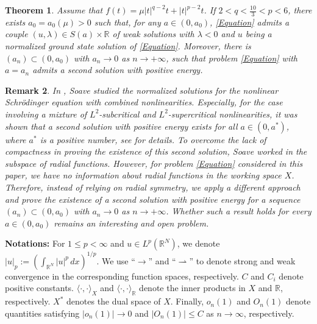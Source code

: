 \documentclass[11pt]{amsart}
\newtheorem{theorem}{Theorem}[section]
\newtheorem{remark}[theorem]{Remark}
\numberwithin{equation}{section}
\newcommand\R{\mathbb R}
\begin{document}
{{{\begin{theorem}\label{Th3}
     Assume that $ f(t)=\mu|t|^{q-2}t +|t|^{p-2}t$. If $2<q<\frac{10}{3}<p <6$, {there exists $a_0=a_0(\mu)>0$ such that}, for any $a \in\left(0, a_0\right)$,
     \eqref{Equation} admits a couple {$\left(u, \lambda\right) \in S(a) \times \R$ of weak solutions with  $\lambda<0$ and $u$ being a normalized ground state solution of \eqref{Equation}}. {Moreover, there is $(a_n) \subset (0,a_0)$ with $a_n \to 0$ as $n \to+\infty$, such that problem \eqref{Equation} with $a=a_n$ admits a second solution with positive energy.}
\end{theorem}
\begin{remark}
In \cite{SoavenonC}, Soave studied the normalized solutions for the nonlinear Schr\"{o}dinger equation with combined nonlinearities. Especially, for the case involving a mixture of $L^{2}$-subcritical and $L^{2}$-supercritical nonlinearities, it was shown that a second solution with positive energy exists for all $a\in (0, a^{*})$, where $a^{*}$ is a positive number, see \cite[Theorem 1.3]{SoavenonC} for details. To overcome the lack of compactness in proving the existence of this second solution, Soave worked in the subspace of radial functions. However, for problem \eqref{Equation} considered in this paper, we have no information about radial functions in the working space $X$. Therefore, instead of relying on radial symmetry, we apply a different approach and prove the existence of a second solution with positive energy for a sequence $(a_n) \subset (0,a_0)$ with $a_n \to 0$ as $n \to+\infty$. Whether such a result holds for every $a\in (0, a_{0})$ remains an interesting and open problem.
\end{remark}


\noindent\textbf{Notations:}
\noindent
For $1 \leq p < \infty$ and $u \in L^p(\mathbb{R}^N)$, we denote $|u|_p := \left(\int_{\mathbb{R}^N} |u|^p\, dx \right)^{1/p}$. We use ``$\to$'' and ``$\rightharpoonup$'' to denote strong and weak convergence in the corresponding function spaces, respectively. $C$ and $C_i$ denote positive constants. $\langle \cdot, \cdot \rangle_X$ and $\langle \cdot, \cdot \rangle_{\mathbb{R}}$ denote the inner products in $X$ and $\mathbb{R}$, respectively. $X^*$ denotes the dual space of $X$. Finally, $o_n(1)$ and $O_n(1)$ denote quantities satisfying $|o_n(1)| \to 0$ and $|O_n(1)| \leq C$ as $n \to \infty$, respectively.


}}}
\end{document}

